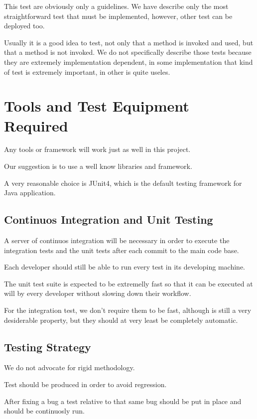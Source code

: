 \documentclass[11pt]{article} %
\begin{document}
This test are obviously only a guidelines. We have describe only the most straightforward test that must be implemented, however, other test can be deployed too.

Usually it is a good idea to test, not only that a method is invoked and used, but that a method is not invoked. We do not specifically describe those tests because they are extremely implementation dependent, in some implementation that kind of test is extremely important, in other is quite useles.

\newpage
\section{Tools and Test Equipment Required}

Any tools or framework will work just as well in this project.

Our suggestion is to use a well know libraries and framework.

A very reasonable choice is JUnit4, which is the default testing framework for Java application.

\subsection{Continuos Integration and Unit Testing}

A server of continuos integration will be necessary in order to execute the integration tests and the  unit tests after each commit to the main code base.

Each developer should still be able to run every test in its developing machine.

The unit test suite is expected to be extremelly fast so that it can be executed at will by every developer without slowing down their workflow.

For the integration test, we don't require them to be fast, although is still a very desiderable property, but they should at very least be completely automatic.

\subsection{Testing Strategy}

We do not advocate for rigid methodology. 

Test should be produced in order to avoid regression. 

After fixing a bug a test relative to that same bug should be put in place and should be continuosly run.
\end{document}
